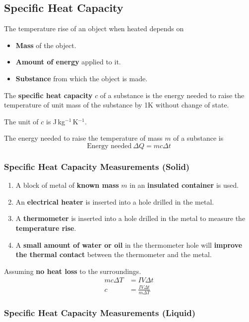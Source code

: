 \subsection{Specific Heat Capacity}

The temperature rise of an object when heated depends on
\begin{itemize}
    \item \textbf{Mass} of the object.
    \item \textbf{Amount of energy} applied to it.
    \item \textbf{Substance} from which the object is made.
\end{itemize}

The \textbf{specific heat capacity} $c$ of a substance is the energy needed to raise the temperature of unit mass of the substance by 1K without change of state.

The unit of $c$ is J\,kg$^{-1}$\,K$^{-1}$.

The energy needed to raise the temperature of mass $m$ of a substance is
$$\text{Energy needed}\ \Delta Q=mc\Delta t$$

\subsubsection*{Specific Heat Capacity Measurements (Solid)}

\begin{enumerate}
    \item A block of metal of \textbf{known mass} $m$ in an \textbf{insulated container} is used.
    \item An \textbf{electrical heater} is inserted into a hole drilled in the metal.
    \item A \textbf{thermometer} is inserted into a hole drilled in the metal to measure the \textbf{temperature rise}.
    \item A \textbf{small amount of water or oil} in the thermometer hole will \textbf{improve the thermal contact} between the thermometer and the metal.
\end{enumerate}

Assuming \textbf{no heat loss} to the surroundings.
\begin{align*}
    mc\Delta T&=IV\Delta t\\
    c&=\frac{IV\Delta t}{m\Delta T}
\end{align*}

\subsubsection*{Specific Heat Capacity Measurements (Liquid)}

